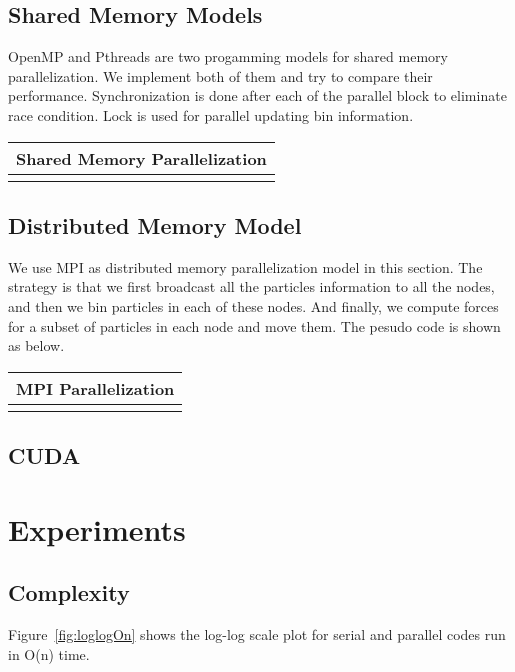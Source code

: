 \documentclass[11pt]{article}
\begin{document}
\subsection{Shared Memory Models}
OpenMP and Pthreads are two progamming models for shared memory parallelization. We implement both of them and try to 
compare their performance. Synchronization is done after each of the parallel block to eliminate race condition. Lock
is used for parallel updating bin information.

\begin{table}[htb]
  \centering
  \begin{tabular}{l}
    \hline
      Shared Memory Parallelization\\
    \hline
      \\
    \hline
  \end{tabular}
  \label{tab:shared_memory}
\end{table}

\subsection{Distributed Memory Model}
We use MPI \cite{mpi} as distributed memory parallelization model in this section. The strategy is that we first broadcast
all the particles information to all the nodes, and then we bin particles in each of these nodes. And finally, we 
compute forces for a subset of particles in each node and move them. The pesudo code is shown as below.

\begin{table}[htb]
  \centering
  \begin{tabular}{l}
    \hline
      MPI Parallelization\\
    \hline
      \\
    \hline
  \end{tabular}
  \label{tab:mpi_naive}
\end{table}

\subsection{CUDA}


\section{Experiments}
\subsection{Complexity}
Figure~\ref{fig:loglogOn} shows the log-log scale plot for serial and parallel codes run in O(n) time.
\end{document}
